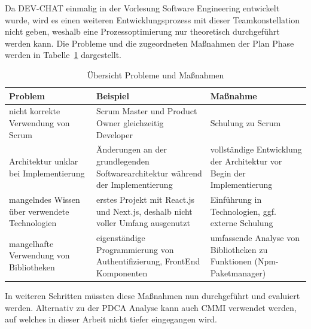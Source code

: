 Da DEV-CHAT einmalig in der Vorlesung Software Engineering entwickelt wurde, wird es einen weiteren Entwicklungsprozess mit dieser Teamkonstellation nicht geben, weshalb eine Prozessoptimierung nur theoretisch durchgeführt werden kann.
Die Probleme und die zugeordneten Maßnahmen der Plan Phase werden in Tabelle~\ref{tab:pdca} dargestellt.
\begin{table}[H]
  \centering
  \begin{tabular}{l|l|l}
    \textbf{Problem} & 
    \textbf{Beispiel} & 
    \textbf{Maßnahme} 
    \\\hline
    \multirow{3}{.25\textwidth}{nicht korrekte Verwendung von Scrum} & 
    \multirow{3}{.35\textwidth}{Scrum Master und Product Owner gleichzeitig Developer} & 
    \multirow{3}{.3\textwidth}{Schulung zu Scrum} 
    \\
    &&\\
    &&\\\hline
    \multirow{4}{.25\textwidth}{Architektur unklar bei Implementierung} &
    \multirow{4}{.35\textwidth}{Änderungen an der grund\-le\-gen\-den Softwarearchitektur während der Implementierung} & 
    \multirow{4}{.3\textwidth}{vollständige Entwicklung der Architektur vor Begin der Implementierung} 
    \\
    &&\\
    &&\\
    &&\\\hline
    \multirow{3}{.25\textwidth}{mangelndes Wissen über verwendete Technologien} & 
    \multirow{3}{.35\textwidth}{erstes Projekt mit React.js und Next.js, deshalb nicht voller Umfang ausgenutzt} & 
    \multirow{3}{.3\textwidth}{Einführung in Technologien, ggf. externe Schulung}
    \\
    &&\\
    &&\\\hline
    \multirow{3}{.25\textwidth}{mangelhafte Verwendung von Bibliotheken} &
    \multirow{3}{.35\textwidth}{eigenständige Programmierung von Authentifizierung, FrontEnd Komponenten} & 
    \multirow{3}{.3\textwidth}{umfassende Analyse von Bibliotheken zu Funktionen (Npm-Paketmanager)}
    \\
    &&\\
    &&\\ 
  \end{tabular}
  \caption{Übersicht Probleme und Maßnahmen}
  \label{tab:pdca}
\end{table}\noindent
In weiteren Schritten müssten diese Maßnahmen nun durchgeführt und evaluiert werden.
Alternativ zu der PDCA Analyse kann auch \ac{CMMI} verwendet werden, auf welches in dieser Arbeit nicht tiefer eingegangen wird.
